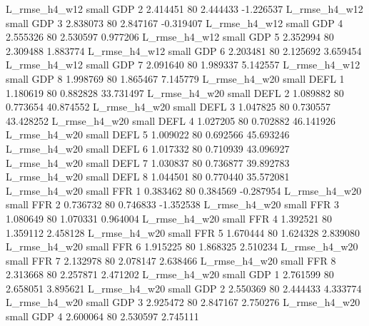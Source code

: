  L_rmse_h4_w12      small      GDP                 2 2.414451 80       2.444433          -1.226537
 L_rmse_h4_w12      small      GDP                 3 2.838073 80       2.847167          -0.319407
 L_rmse_h4_w12      small      GDP                 4 2.555326 80       2.530597           0.977206
 L_rmse_h4_w12      small      GDP                 5 2.352994 80       2.309488           1.883774
 L_rmse_h4_w12      small      GDP                 6 2.203481 80       2.125692           3.659454
 L_rmse_h4_w12      small      GDP                 7 2.091640 80       1.989337           5.142557
 L_rmse_h4_w12      small      GDP                 8 1.998769 80       1.865467           7.145779
 L_rmse_h4_w20      small     DEFL                 1 1.180619 80       0.882828          33.731497
 L_rmse_h4_w20      small     DEFL                 2 1.089882 80       0.773654          40.874552
 L_rmse_h4_w20      small     DEFL                 3 1.047825 80       0.730557          43.428252
 L_rmse_h4_w20      small     DEFL                 4 1.027205 80       0.702882          46.141926
 L_rmse_h4_w20      small     DEFL                 5 1.009022 80       0.692566          45.693246
 L_rmse_h4_w20      small     DEFL                 6 1.017332 80       0.710939          43.096927
 L_rmse_h4_w20      small     DEFL                 7 1.030837 80       0.736877          39.892783
 L_rmse_h4_w20      small     DEFL                 8 1.044501 80       0.770440          35.572081
 L_rmse_h4_w20      small      FFR                 1 0.383462 80       0.384569          -0.287954
 L_rmse_h4_w20      small      FFR                 2 0.736732 80       0.746833          -1.352538
 L_rmse_h4_w20      small      FFR                 3 1.080649 80       1.070331           0.964004
 L_rmse_h4_w20      small      FFR                 4 1.392521 80       1.359112           2.458128
 L_rmse_h4_w20      small      FFR                 5 1.670444 80       1.624328           2.839080
 L_rmse_h4_w20      small      FFR                 6 1.915225 80       1.868325           2.510234
 L_rmse_h4_w20      small      FFR                 7 2.132978 80       2.078147           2.638466
 L_rmse_h4_w20      small      FFR                 8 2.313668 80       2.257871           2.471202
 L_rmse_h4_w20      small      GDP                 1 2.761599 80       2.658051           3.895621
 L_rmse_h4_w20      small      GDP                 2 2.550369 80       2.444433           4.333774
 L_rmse_h4_w20      small      GDP                 3 2.925472 80       2.847167           2.750276
 L_rmse_h4_w20      small      GDP                 4 2.600064 80       2.530597           2.745111
